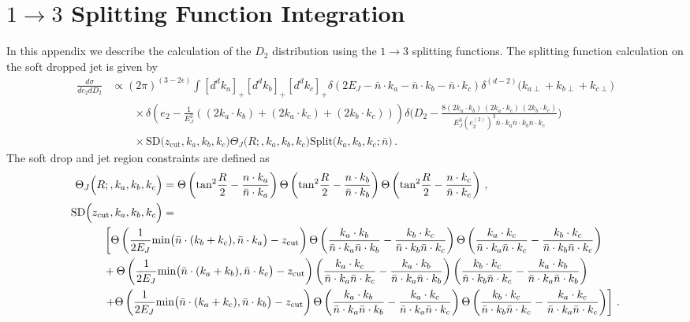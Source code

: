 \documentclass[a4paper,11pt]{article}
\newcommand{\nbar}{{\bar n}}
\newcommand{\ecf}[2]{e_{#1}^{(#2)}}
\newcommand{\nn}{\nonumber}
\def\zcut{z_{\text{cut}}}
\def\nbar{\bar n}
\begin{document}
\section{$1\rightarrow 3$ Splitting Function Integration}\label{app:1to3}

In this appendix we describe the calculation of the $D_2$ distribution using the $1\to 3$ splitting functions.
The splitting function calculation on the soft dropped jet is given by
{\small\begin{align}
\frac{d\sigma}{de_2 dD_2}&\propto(2\pi)^{(3-2\epsilon)}\int[d^dk_a]_+[d^dk_b]_+[d^dk_c]_+\delta(2E_J-\nbar\cdot k_a-\nbar\cdot k_b-\nbar\cdot k_c)\delta^{(d-2)}\Big(k_{a\perp}+k_{b\perp}+k_{c\perp}\Big)\nonumber\\
&\qquad\times\delta\left(e_2-\frac{1}{E_J^2}((2k_a\cdot k_b)+(2 k_a\cdot k_c) +(2k_b\cdot k_c))\right)\delta\Bigg(D_2-\frac{8(2k_a\cdot k_b)\,(2 k_a\cdot k_c) \,(2k_b\cdot k_c)}{E_J^3(\ecf{2}{2})^3\nbar\cdot k_a\nbar\cdot k_b \nbar\cdot k_c}\Bigg)\nonumber\\
&\qquad\times\text{SD}\Big(\zcut,k_a,k_b,k_c\Big)\Theta_{J}\Big(R;,k_a,k_b,k_c\Big)\text{Split}\Big(k_a,k_b,k_c;\nbar\Big)\,.
\end{align}}
The soft drop and jet region constraints are defined as
{\scriptsize\begin{align}
\Theta_{J}\Big(R;,k_a,k_b,k_c\Big)&=\Theta\left(\text{tan}^2\frac{R}{2}-\frac{n\cdot k_a}{\nbar \cdot k_a}\right)\Theta\left(\text{tan}^2\frac{R}{2}-\frac{n\cdot k_b}{\nbar \cdot k_b}\right)\Theta\left(\text{tan}^2\frac{R}{2}-\frac{n\cdot k_c}{\nbar \cdot k_c}\right) \,,\\
\text{SD}\Big(\zcut,k_a,k_b,k_c\Big)&= \\
&\hspace{-1.9cm}\left[\Theta\left(\frac{1}{2E_J}\text{min}\big(\nbar\cdot(k_b+k_c),\nbar\cdot k_a \big)-\zcut\right)\Theta\left(\frac{k_a\cdot k_b}{\nbar\cdot k_a\nbar\cdot k_b}-\frac{k_b\cdot k_c}{\nbar\cdot k_b\nbar\cdot k_c}\right)\Theta\left(\frac{k_a\cdot k_c}{\nbar\cdot k_a\nbar\cdot k_c}-\frac{k_b\cdot k_c}{\nbar\cdot k_b\nbar\cdot k_c}\right) \right.\nonumber\\
&\hspace{-1.9cm}+\Theta\left(\frac{1}{2E_J}\text{min}\big(\nbar\cdot(k_a+k_b),\nbar\cdot k_c \big)-\zcut\right)\left(\frac{k_a\cdot k_c}{\nbar\cdot k_a\nbar\cdot k_c}-\frac{k_a\cdot k_b}{\nbar\cdot k_a\nbar\cdot k_b}\right)\left(\frac{k_b\cdot k_c}{\nbar\cdot k_b\nbar\cdot k_c}-\frac{k_a\cdot k_b}{\nbar\cdot k_a\nbar\cdot k_b}\right)\nonumber\\
&\hspace{-1.9cm}\left.+\Theta\left(\frac{1}{2E_J}\text{min}\big(\nbar\cdot(k_a+k_c),\nbar\cdot k_b \big)-\zcut\right)\Theta\left(\frac{k_a\cdot k_b}{\nbar\cdot k_a\nbar\cdot k_b}-\frac{k_a\cdot k_c}{\nbar\cdot k_a\nbar\cdot k_c}\right)\Theta\left(\frac{k_b\cdot k_c}{\nbar\cdot k_b\nbar\cdot k_c}-\frac{k_a\cdot k_c}{\nbar\cdot k_a\nbar\cdot k_c}\right)\right]\,. \nn
\end{align}}
\end{document}
